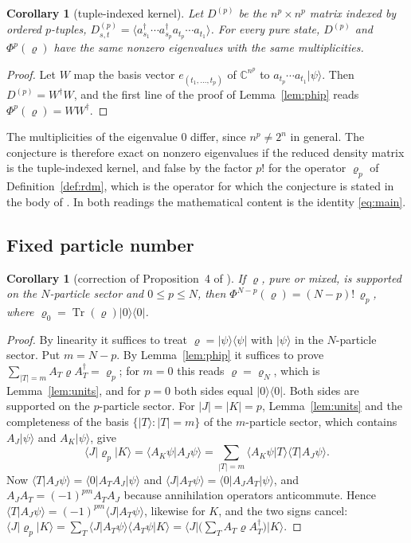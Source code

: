 \documentclass[11pt,a4paper]{article}
\newtheorem{corollary}[theorem]{Corollary}
\theoremstyle{definition}
\theoremstyle{plain}
\DeclareMathOperator{\Tr}{Tr}
\newcommand{\ket}[1]{\lvert#1\rangle}
\newcommand{\bra}[1]{\langle#1\rvert}
\newcommand{\braket}[2]{\langle#1\vert#2\rangle}
\newcommand{\C}{\mathbb{C}}
\begin{document}
\begin{corollary}[tuple-indexed kernel]\label{cor:kernel}
Let $D^{(p)}$ be the $n^p\times n^p$ matrix indexed by ordered $p$-tuples,
$D^{(p)}_{s,t}=\langle a_{s_1}^\dagger\cdots a_{s_p}^\dagger
a_{t_p}\cdots a_{t_1}\rangle$. For every pure state, $D^{(p)}$ and
$\Phi^p(\varrho)$ have the same nonzero eigenvalues with the same
multiplicities.
\end{corollary}

\begin{proof}
Let $W$ map the basis vector $e_{(t_1,\dots,t_p)}$ of $\C^{n^p}$ to
$a_{t_p}\cdots a_{t_1}\ket\psi$. Then $D^{(p)}=W^\dagger W$, and the first
line of the proof of Lemma~\ref{lem:phip} reads $\Phi^p(\varrho)=WW^\dagger$.
\end{proof}

The multiplicities of the eigenvalue $0$ differ, since $n^p\ne2^n$ in
general. The conjecture is therefore exact on nonzero eigenvalues if the
reduced density matrix is the tuple-indexed kernel, and false by the factor
$p!$ for the operator $\varrho_p$ of Definition~\ref{def:rdm}, which is the
operator for which the conjecture is stated in the body of
\cite{AmosovFilippov2017}. In both readings the mathematical content is the
identity \eqref{eq:main}.

\subsection{Fixed particle number}
\begin{corollary}[correction of Proposition~4 of \cite{AmosovFilippov2017}]
\label{cor:fixedN}
If $\varrho$, pure or mixed, is supported on the $N$-particle sector and
$0\le p\le N$, then $\Phi^{N-p}(\varrho)=(N-p)!\,\varrho_p$, where
$\varrho_0=\Tr(\varrho)\ket0\bra0$.
\end{corollary}

\begin{proof}
By linearity it suffices to treat $\varrho=\ket\psi\bra\psi$ with $\ket\psi$
in the $N$-particle sector. Put $m=N-p$. By Lemma~\ref{lem:phip} it suffices
to prove $\sum_{|T|=m}A_T\varrho A_T^\dagger=\varrho_p$; for $m=0$ this reads
$\varrho=\varrho_N$, which is Lemma~\ref{lem:units}, and for $p=0$ both sides
equal $\ket0\bra0$. Both sides are supported on the $p$-particle sector. For
$|J|=|K|=p$, Lemma~\ref{lem:units} and the completeness of the basis
$\{\ket T:|T|=m\}$ of the $m$-particle sector, which contains $A_J\ket\psi$
and $A_K\ket\psi$, give
\[
\bra J\varrho_p\ket K=\braket{A_K\psi}{A_J\psi}
=\sum_{|T|=m}\braket{A_K\psi}{T}\braket{T}{A_J\psi}.
\]
Now $\braket{T}{A_J\psi}=\bra0A_TA_J\ket\psi$ and
$\braket{J}{A_T\psi}=\bra0A_JA_T\ket\psi$, and
$A_JA_T=(-1)^{pm}A_TA_J$ because annihilation operators anticommute. Hence
$\braket{T}{A_J\psi}=(-1)^{pm}\braket{J}{A_T\psi}$, likewise for $K$, and the
two signs cancel:
$\bra J\varrho_p\ket K=\sum_T\braket{J}{A_T\psi}\braket{A_T\psi}{K}
=\bra J\big(\sum_TA_T\varrho A_T^\dagger\big)\ket K$.
\end{proof}
\end{document}
